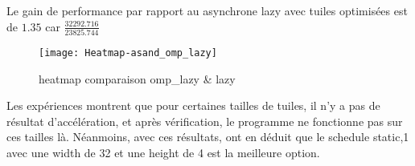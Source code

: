 \documentclass[10pt, a4paper]{article}
\begin{document}
Le gain de performance par rapport au asynchrone lazy avec tuiles optimisées est de $1.35$ car $\frac{32292.716}{23825.744}$

\begin{figure}[H]
    \centering
    \texttt{[image: Heatmap-asand\_omp\_lazy]}
    \caption{\small{heatmap comparaison omp\_lazy \& lazy}}
\end{figure}

Les expériences montrent que pour certaines tailles de tuiles, il n'y a pas de résultat d'accélération, et après vérification, le programme ne fonctionne pas sur ces tailles là.
Néanmoins, avec ces résultats, ont en déduit que le schedule static,1 avec une width de 32 et une height de 4 est la meilleure option.
\end{document}
